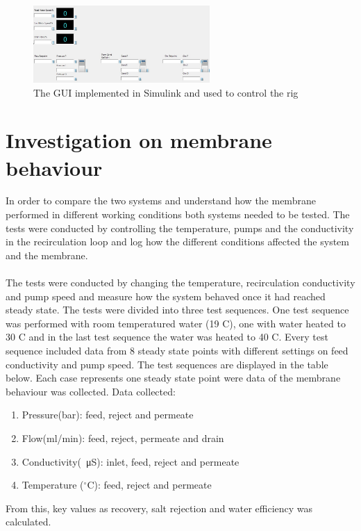 \begin{figure}[H]
    \centering
    \includegraphics[width=0.6\textwidth]{GUI}
    \caption{The GUI implemented in Simulink and used to control the rig}
    \label{fig:gui}
\end{figure}


\newpage


\section{Investigation on membrane behaviour}

In order to compare the two systems and understand how the membrane performed in different working conditions both systems needed to be tested. The tests were conducted by controlling the temperature, pumps and the conductivity in the recirculation loop and log how the different conditions affected the system and the membrane. \\
\\
The tests were conducted by changing the temperature, recirculation conductivity and pump speed and measure how the system behaved once it had reached steady state. The tests were divided into three test sequences. One test sequence was performed with room temperatured water (19 C), one with water heated to 30 C and in the last test sequence the water was heated to 40 C. Every test sequence included data from 8 steady state points with different settings on feed conductivity and pump speed. The test sequences are displayed in the table below. Each case represents one steady state point were data of the membrane behaviour was collected. Data collected:
\begin{enumerate}
\item Pressure(bar): feed, reject and permeate
\item Flow(ml/min): feed, reject, permeate and drain
\item Conductivity(\SI{}{\micro\siemens}): inlet, feed, reject and permeate
\item Temperature ($^\circ$C): feed, reject and permeate
\end{enumerate}
From this, key values as recovery, salt rejection and water efficiency was calculated.

